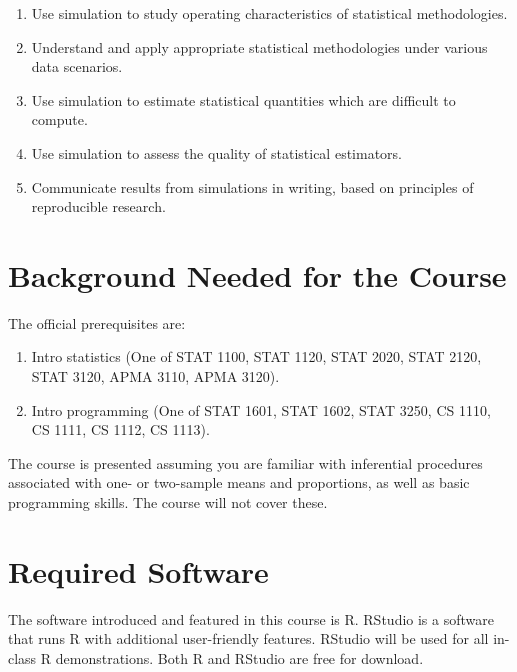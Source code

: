 \documentclass[
]{book}
\providecommand{\tightlist}{%
  \setlength{\itemsep}{0pt}\setlength{\parskip}{0pt}}
\theoremstyle{definition}
\theoremstyle{definition}
\theoremstyle{definition}
\theoremstyle{definition}
\theoremstyle{remark}
\begin{document}
\begin{enumerate}
\def\labelenumi{\arabic{enumi}.}
\tightlist
\item
  Use simulation to study operating characteristics of statistical methodologies.
\item
  Understand and apply appropriate statistical methodologies under various data scenarios.
\item
  Use simulation to estimate statistical quantities which are difficult to compute.
\item
  Use simulation to assess the quality of statistical estimators.
\item
  Communicate results from simulations in writing, based on principles of reproducible research.
\end{enumerate}

\hypertarget{background-needed-for-the-course}{%
\section*{Background Needed for the Course}\label{background-needed-for-the-course}}

The official prerequisites are:

\begin{enumerate}
\def\labelenumi{\arabic{enumi}.}
\tightlist
\item
  Intro statistics (One of STAT 1100, STAT 1120, STAT 2020, STAT 2120, STAT 3120, APMA 3110, APMA 3120).
\item
  Intro programming (One of STAT 1601, STAT 1602, STAT 3250, CS 1110, CS 1111, CS 1112, CS 1113).
\end{enumerate}

The course is presented assuming you are familiar with inferential procedures associated with one- or two-sample means and proportions, as well as basic programming skills. The course will not cover these.

\hypertarget{required-software}{%
\section*{Required Software}\label{required-software}}

The software introduced and featured in this course is R. RStudio is a software that runs R with additional user-friendly features. RStudio will be used for all in-class R demonstrations. Both R and RStudio are free for download.
\end{document}
